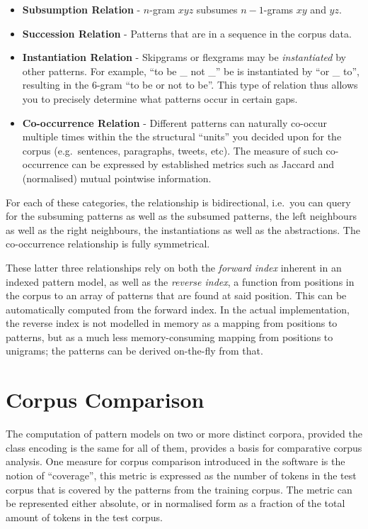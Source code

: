 \begin{itemize}
 \item \textbf{Subsumption Relation} - $n$-gram $x y z$ subsumes $n-1$-grams $x y$ and $y z$. 
 \item \textbf{Succession Relation} - Patterns that are in a sequence in the corpus data. 
 \item \textbf{Instantiation Relation} - Skipgrams or flexgrams may be
     \emph{instantiated} by other patterns. For example, ``to be \_ not \_'' be
     is instantiated by ``or \_ to'', resulting in the 6-gram ``to be or not to be''. This type of relation thus allows you to precisely determine what patterns occur in certain gaps.
 \item \textbf{Co-occurrence Relation} - Different patterns can naturally co-occur multiple times
     within the the structural ``units'' you decided upon for the corpus (e.g.\ 
     sentences, paragraphs, tweets, etc). The measure of such co-occurrence 
     can be expressed by established metrics such as Jaccard and (normalised) mutual
     pointwise information.
\end{itemize}

For each of these categories, the relationship is bidirectional, i.e.\ you can
query for the subsuming patterns as well as the subsumed patterns, the left
neighbours as well as the right neighbours, the instantiations as well as the
abstractions. The co-occurrence relationship is fully symmetrical. 

These latter three relationships rely on both the \emph{forward index} inherent
in an indexed pattern model, as well as the \emph{reverse index}, a function
from positions in the corpus to an array of patterns that are found at said
position. This can be automatically computed from the forward index. In the
actual implementation, the reverse index is not modelled in memory as a mapping from
positions to patterns, but as a much less memory-consuming mapping from
positions to unigrams; the patterns can be derived on-the-fly from that.

\section{Corpus Comparison}

The computation of pattern models on two or more distinct corpora, provided the
class encoding is the same for all of them, provides a basis for comparative
corpus analysis. One measure for corpus comparison introduced in the software
is the notion of ``coverage'', this metric is expressed as the number of tokens
in the test corpus that is covered by the patterns from the training corpus.
The metric can be represented either absolute, or in normalised form as a
fraction of the total amount of tokens in the test corpus. 

